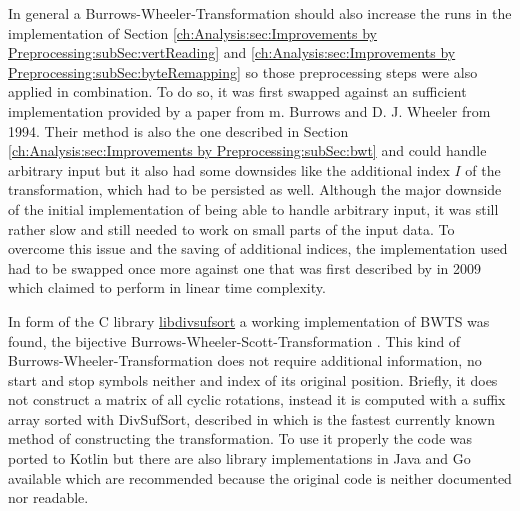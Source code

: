 \par{
In general a Burrows-Wheeler-Transformation should also increase the runs in the implementation of Section \ref{ch:Analysis:sec:Improvements by Preprocessing:subSec:vertReading} and \ref{ch:Analysis:sec:Improvements by Preprocessing:subSec:byteRemapping} so those preprocessing steps were also applied in combination. To do so, it was first swapped against an sufficient implementation provided by a paper from m. Burrows and D. J. Wheeler \cite{Burrows94} from 1994. Their method is also the one described in Section \ref{ch:Analysis:sec:Improvements by Preprocessing:subSec:bwt} and could handle arbitrary input but it also had some downsides like the additional index $I$ of the transformation, which had to be persisted as well. Although the major downside of the initial implementation of being able to handle arbitrary input, it was still rather slow and still needed to work on small parts of the input data. To overcome this issue and the saving of additional indices, the implementation used had to be swapped once more against one that was first described by \cite{Burrows-linear-time} in 2009 which claimed to perform in linear time complexity.
} 
\par{
In form of the C library \href{https://code.google.com/archive/p/libdivsufsort}{libdivsufsort} a working implementation of BWTS was found, the bijective Burrows-Wheeler-Scott-Transformation \cite{DBLP:journals/corr/abs-1201-3077}. This kind of Burrows-Wheeler-Transformation does not require additional information, no start and stop symbols neither and index of its original position. Briefly, it does not construct a matrix of all cyclic rotations, instead it is computed with a suffix array sorted with DivSufSort, described in \cite{DBLP:journals/corr/abs-1710-01896} which is the fastest currently known method of constructing the transformation. To use it properly the code was ported to Kotlin but there are also library implementations in Java and Go available which are recommended because the original code is neither documented nor readable.
}
